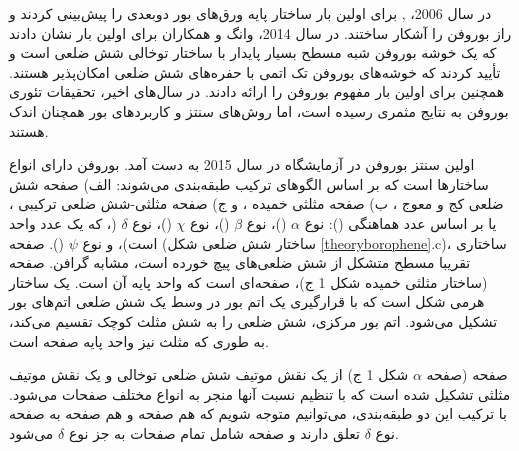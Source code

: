 در سال 2006،  ,  \cite{kunstmannBroadBoronSheets2006} برای اولین بار ساختار پایه ورق‌های بور دوبعدی را پیش‌بینی کردند و راز بوروفن را آشکار ساختند. در سال 2014، وانگ و همکاران \cite{zhaiObservationAllboronFullerene2014} برای اولین بار نشان دادند که  یک خوشه بوروفن شبه مسطح بسیار پایدار با ساختار توخالی شش ضلعی است و تأیید کردند که خوشه‌های بوروفن تک اتمی با حفره‌های شش ضلعی امکان‌پذیر هستند. همچنین برای اولین بار مفهوم بوروفن را ارائه دادند. در سال‌های اخیر، تحقیقات تئوری بوروفن به نتایج مثمری رسیده است، اما روش‌های سنتز و کاربردهای بور همچنان اندک هستند.

اولین سنتز بوروفن در آزمایشگاه در سال 2015 به دست آمد. بوروفن دارای انواع ساختارها است که بر اساس الگوهای ترکیب طبقه‌بندی می‌شوند: الف) صفحه شش ضلعی کج‌ و معوج ، ب) صفحه مثلثی خمیده ، و ج) صفحه مثلثی-شش ضلعی ترکیبی ، یا بر اساس عدد هماهنگی (): نوع $\alpha$ ()، نوع $\beta$ ()، نوع $\chi$ ()، نوع $\delta$ (، که  یک عدد واحد است)، و نوع $\psi$ ().\cite{wuTwoDimensionalBoronMonolayer2012}
صفحه  (ساختار شش ضلعی شکل \ref{theoryborophene}.c)، ساختاری تقریبا مسطح متشکل از شش ضلعی‌های پیچ خورده \cite{bezuglyHighlyConductiveBoron2011}است، مشابه گرافن. صفحه  (ساختار مثلثی خمیده شکل 1 ج)، صفحه‌ای است که واحد پایه آن  است.  یک ساختار هرمی شکل است که با قرارگیری یک اتم بور در وسط یک شش ضلعی اتم‌های بور تشکیل می‌شود. \cite{mannixSynthesisBorophenesAnisotropic2015, wuTwoDimensionalBoronMonolayer2012} اتم بور مرکزی، شش ضلعی را به شش مثلث کوچک تقسیم می‌کند، به طوری که مثلث نیز واحد پایه صفحه  است.

صفحه  (صفحه $\alpha$ شکل 1 ج) از یک نقش موتیف شش ضلعی توخالی  و یک نقش موتیف مثلثی  تشکیل شده است که با تنظیم نسبت آنها منجر به انواع مختلف صفحات  می‌شود. \cite{yangInitioPredictionStable2008, tianPlanar2hB26H82013, penevPolymorphismTwoDimensionalBoron2012, tangFirstprinciplesStudyBoron2010, lauThermodynamicStabilityNovel2008, lauStabilityElectronicProperties2007} با ترکیب این دو طبقه‌بندی، می‌توانیم متوجه شویم که هم صفحه  و هم صفحه  به صفحه نوع $\delta$ تعلق دارند و صفحه  شامل تمام صفحات به جز نوع $\delta$ می‌شود.


